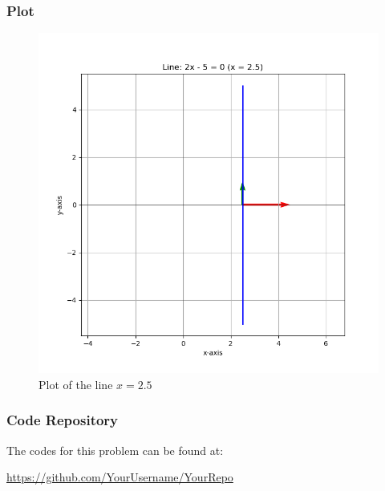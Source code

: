 \documentclass{beamer}
\begin{document}
\begin{frame}
\frametitle{Plot}
\begin{figure}[H]
    \centering
    \includegraphics[width=0.6\columnwidth]{Figs/Figure_1.png}
    \caption{Plot of the line $x = 2.5$}
    \label{fig:428}
\end{figure}
\end{frame}

\begin{frame}
\frametitle{Code Repository}
The codes for this problem can be found at:

\centering
\url{https://github.com/YourUsername/YourRepo}
\end{frame}
\end{document}
